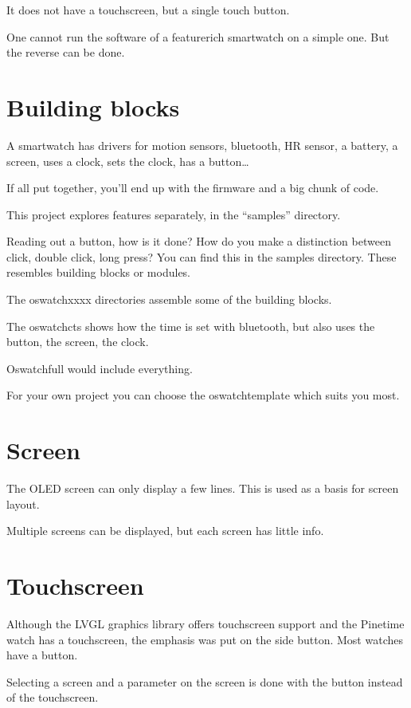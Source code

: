 \documentclass[letterpaper,10pt,english]{sphinxmanual}
\begin{document}
It does not have a touchscreen, but a single touch button.

One cannot run the software of a feature\sphinxhyphen{}rich smartwatch on a simple one.
But the reverse can be done.


\section{Building blocks}
\label{\detokenize{idea:building-blocks}}
A smartwatch has drivers for motion sensors, bluetooth, HR sensor, a battery, a screen, uses a clock, sets the clock, has a button…

If all put together, you’ll end up with the firmware and a big chunk of code.

This project explores features separately, in the “samples” directory.

Reading out a button, how is it done? How do you make a distinction between click, double click, long press? You can find this in the samples directory. These resembles building blocks or modules.

The oswatch\sphinxhyphen{}xxxx directories assemble some of the building blocks.

The oswatch\sphinxhyphen{}cts shows how the time is set with bluetooth, but also uses the button, the screen, the clock.

Oswatch\sphinxhyphen{}full would include everything.

For your own project you can choose the oswatch\sphinxhyphen{}template which suits you most.


\section{Screen}
\label{\detokenize{idea:screen}}
The OLED screen can only display a few lines.
This is used as a basis for screen layout.

Multiple screens can be displayed, but each screen has little info.


\section{Touchscreen}
\label{\detokenize{idea:touchscreen}}
Although the LVGL graphics library offers touchscreen support and the Pinetime watch has a touchscreen, the emphasis was put on the side button. Most watches have a button.

Selecting a screen and a parameter on the screen is done with the button instead of the touchscreen.
\end{document}
